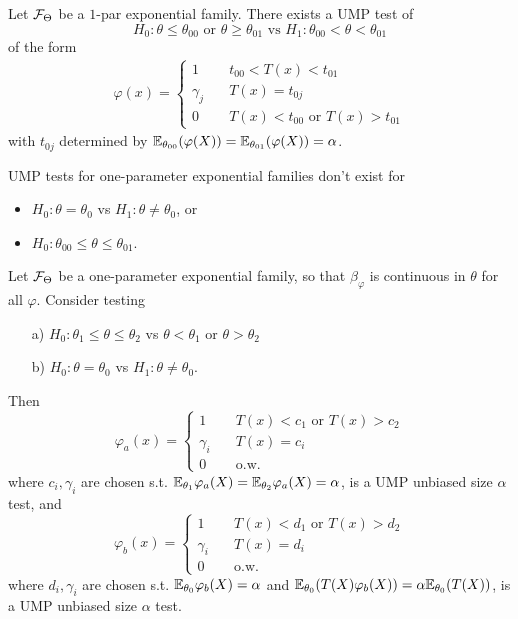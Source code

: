 \begin{cor}
	Let $\mathcal{F}_\Theta$ be a $1$-par exponential family. There exists a UMP test of 
	$$H_0: \theta \leq \theta_{00} \text{ or } \theta\geq \theta_{01} \text{ vs } H_1:\theta_{00}<\theta<\theta_{01}$$
	of the form 
	\begin{align*}
	\varphi(x) = \begin{cases}
	1 &\quad t_{00} <T(x) < t_{01} \\
	\gamma_j &\quad T(x) = t_{0j} \\
	0 &\quad T(x) < t_{00} \text{ or } T(x)> t_{01}
	\end{cases}
	\end{align*}
	with $t_{0j}$ determined by $\mathbb{E}_{\theta_{00}} ( \varphi(X) ) = \mathbb{E}_{\theta_{01}} ( \varphi(X) ) = \alpha$.
\end{cor}
\begin{remark}
	UMP tests for one-parameter exponential families don't exist for 
	\begin{itemize}
		\item $H_0: \theta=\theta_0$ vs $H_1: \theta \neq \theta_0$, or
		\item $H_0: \theta_{00} \leq \theta \leq \theta_{01}$.
	\end{itemize}
\end{remark}

\begin{thm}
	Let $\mathcal{F}_\Theta$ be a one-parameter exponential family, so that $\beta_\varphi$ is continuous in $\theta$ for all $\varphi$. Consider testing 
	\begin{enumerate}
		\item[a)] $H_0: \theta_{1} \leq \theta \leq \theta_{2}$ vs $\theta< \theta_1 \text{ or } \theta>\theta_2$
		\item[b)] $H_0: \theta=\theta_0$ vs $H_1: \theta \neq \theta_0$.
	\end{enumerate}
	Then $$\varphi_a(x) = \begin{cases}
	1 &\quad  T(x)<c_1 \text{ or } T(x) > c_2 \\
	\gamma_i &\quad T(x) = c_i \\
	0 &\quad \text{o.w.}
	\end{cases}$$
	where $c_i,\gamma_i$ are chosen s.t. $\mathbb{E}_{\theta_1} \varphi_a(X) = \mathbb{E}_{\theta_2} \varphi_a(X)  =\alpha$, is a UMP unbiased size $\alpha$ test, and 
	$$\varphi_b(x) = \begin{cases}
	1 &\quad  T(x)<d_1 \text{ or } T(x) > d_2 \\
	\gamma_i &\quad T(x) = d_i \\
	0 &\quad \text{o.w.}
	\end{cases}$$
	where $d_i,\gamma_i$ are chosen s.t. $\mathbb{E}_{\theta_0} \varphi_b(X)=\alpha$ and $\mathbb{E}_{\theta_0}(T(X) \varphi_b(X)) = \alpha \mathbb{E}_{\theta_0}(T(X))$, is a UMP unbiased size $\alpha$ test.
\end{thm}

